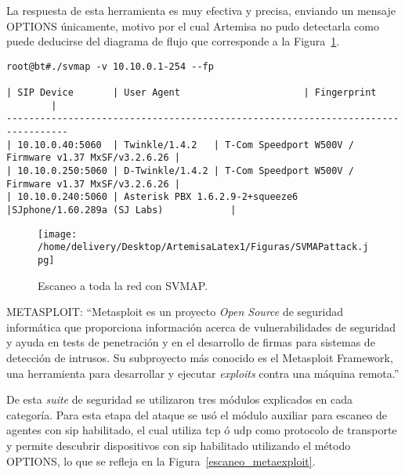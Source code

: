 \documentclass[a4paper,12pt]{report}
\newenvironment{myscriptlisting}
{\begin{list}{}{\setlength{\leftmargin}{1em}}\item\scriptsize\bfseries}
{\end{list}}
\begin{document}
La respuesta de esta herramienta es muy efectiva y precisa, enviando un mensaje
OPTIONS únicamente, motivo por el cual Artemisa no pudo detectarla como puede deducirse
del diagrama de flujo que corresponde a la Figura~\ref{escaneo_svmap}.

\begin{myscriptlisting}
 \begin{verbatim}
root@bt#./svmap -v 10.10.0.1-254 --fp

| SIP Device       | User Agent                      | Fingerprint                                  
        |
---------------------------------------------------------------------------------
| 10.10.0.40:5060  | Twinkle/1.4.2   | T-Com Speedport W500V / Firmware v1.37 MxSF/v3.2.6.26 |
| 10.10.0.250:5060 | D-Twinkle/1.4.2 | T-Com Speedport W500V / Firmware v1.37 MxSF/v3.2.6.26 |
| 10.10.0.240:5060 | Asterisk PBX 1.6.2.9-2+squeeze6 |SJphone/1.60.289a (SJ Labs)            |
 \end{verbatim}
\end{myscriptlisting}

\begin{figure}[h!] 
\centering
\texttt{[image: /home/delivery/Desktop/ArtemisaLatex1/Figuras/SVMAPattack.jpg]}
\caption{Escaneo a toda la red con SVMAP.}
\label{escaneo_svmap}
\end{figure}

METASPLOIT: “Metasploit es un proyecto \emph{Open Source} de seguridad informática que proporciona
 información  acerca de vulnerabilidades de seguridad y ayuda en tests de
penetración y en el desarrollo de firmas para sistemas de detección de intrusos.
Su subproyecto más conocido es el Metasploit Framework, una herramienta para
desarrollar y ejecutar \emph{exploits} contra una máquina
remota.” \cite{metasploit}


De esta \emph{suite} de seguridad se utilizaron tres módulos explicados en cada categoría.
Para esta etapa del ataque se usó el módulo auxiliar para escaneo de
agentes con \ac{sip} habilitado, el cual utiliza \ac{tcp} ó \ac{udp} como protocolo de
transporte y permite descubrir dispositivos con \ac{sip} habilitado utilizando el
método OPTIONS, lo que se refleja en la Figura~\ref{escaneo_metaexploit}.
\end{document}
